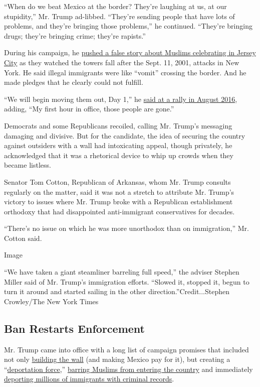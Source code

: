 ``When do we beat Mexico at the border? They're laughing at us, at our
stupidity,'' Mr. Trump ad-libbed. ``They're sending people that have
lots of problems, and they're bringing those problems,'' he continued.
``They're bringing drugs; they're bringing crime; they're rapists.''

During his campaign, he
\href{https://www.nytimes3xbfgragh.onion/2015/11/25/nyregion/a-definitive-debunking-of-donald-trumps-9-11-claims.html}{pushed
a false story about Muslims celebrating in Jersey City} as they watched
the towers fall after the Sept. 11, 2001, attacks in New York. He said
illegal immigrants were like ``vomit'' crossing the border. And he made
pledges that he clearly could not fulfill.

``We will begin moving them out, Day 1,'' he
\href{https://www.nytimes3xbfgragh.onion/2016/09/02/us/politics/transcript-trump-immigration-speech.html}{said
at a rally in August 2016}, adding, ``My first hour in office, those
people are gone.''

Democrats and some Republicans recoiled, calling Mr. Trump's messaging
damaging and divisive. But for the candidate, the idea of securing the
country against outsiders with a wall had intoxicating appeal, though
privately, he acknowledged that it was a rhetorical device to whip up
crowds when they became listless.

Senator Tom Cotton, Republican of Arkansas, whom Mr. Trump consults
regularly on the matter, said it was not a stretch to attribute Mr.
Trump's victory to issues where Mr. Trump broke with a Republican
establishment orthodoxy that had disappointed anti-immigrant
conservatives for decades.

``There's no issue on which he was more unorthodox than on
immigration,'' Mr. Cotton said.

Image

``We have taken a giant steamliner barreling full speed,'' the adviser
Stephen Miller said of Mr. Trump's immigration efforts. ``Slowed it,
stopped it, begun to turn it around and started sailing in the other
direction.''Credit...Stephen Crowley/The New York Times

\hypertarget{ban-restarts-enforcement}{%
\subsection{Ban Restarts Enforcement}\label{ban-restarts-enforcement}}

Mr. Trump came into office with a long list of campaign promises that
included not only
\href{https://www.nytimes3xbfgragh.onion/2017/01/25/world/americas/trump-mexico-border-wall.html}{building
the wall} (and making Mexico pay for it), but creating a
``\href{http://www.msnbc.com/msnbc/trump-vows-humane-deportation-force}{deportation
force},''
\href{https://www.nytimes3xbfgragh.onion/politics/first-draft/2015/12/07/donald-trump-calls-for-banning-muslims-from-entering-u-s/}{barring
Muslims from entering the country} and immediately
\href{https://www.nytimes3xbfgragh.onion/2016/11/15/us/politics/donald-trump-deport-immigrants.html}{deporting
millions of immigrants with criminal records}.

